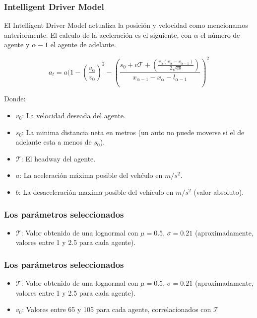 \documentclass[10pt, compress]{beamer}
\begin{document}
\begin{frame}[fragile]

\frametitle{Intelligent Driver Model}
El Intelligent Driver Model actualiza la posici\'on y velocidad como mencionamos anteriormente. El calculo de la aceleraci\'on es el siguiente, con $\alpha$ el n\'umero de agente y $\alpha - 1$ el agente de adelante.

  \begin{equation*}
    a_t = a (1 - (\frac{v_\alpha}{v_0})^2 - (\frac{s_0 + v\mathcal{T} + (\frac{v_\alpha (v_\alpha - v_{\alpha-1})}{2\sqrt{ab}})}{x_{\alpha-1} - x_\alpha - l_{\alpha-1}})^2
  \end{equation*}

Donde:
\begin{itemize}
\item $v_0$: La velocidad deseada del agente.
\item $s_0$: La minima distancia neta en metros (un auto no puede moverse si el de adelante esta a menos de $s_0$).
\item $\mathcal{T}$: El headway del agente.
\item $a$: La aceleraci\'on m\'axima posible del veh\'culo en $m/s^2$.
\item $b$: La desaceleraci\'on maxima posible del veh\'iculo en $m/s^2$ (valor absoluto).
\end{itemize}
\addtocounter{framenumber}{-1}
\end{frame}

\begin{frame}[fragile]

\frametitle{Los par\'ametros seleccionados}

\begin{itemize}

\item $\mathcal{T}$: Valor obtenido de una lognormal con $\mu = 0.5$, $\sigma = 0.21$ (aproximadamente, valores entre 1 y 2.5 para cada agente).

\end{itemize}

\end{frame}

\begin{frame}[fragile]

\frametitle{Los par\'ametros seleccionados}

\begin{itemize}

\item $\mathcal{T}$: Valor obtenido de una lognormal con $\mu = 0.5$, $\sigma = 0.21$ (aproximadamente, valores entre 1 y 2.5 para cada agente).
\item $v_0$: Valores entre 65 y 105 para cada agente, correlacionados con $\mathcal{T}$

\end{itemize}
\addtocounter{framenumber}{-1}
\end{frame}
\end{document}
